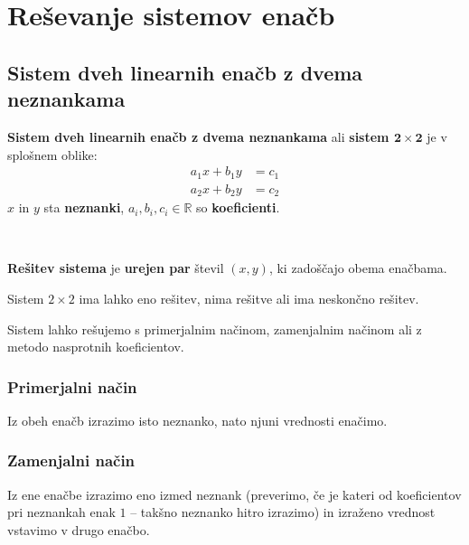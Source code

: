     \section{Reševanje sistemov enačb}

        

            \subsection{Sistem dveh linearnih enačb z dvema neznankama}

                \textbf{Sistem dveh linearnih enačb z dvema neznankama} ali \textbf{sistem $\mathbf{2\times 2}$} je v splošnem oblike:
                    $$\begin{aligned}
                            a_1x+b_1y&=c_1 \\ a_2x+b_2y&=c_2
                        \end{aligned}$$
                $x$ in $y$ sta \textbf{neznanki}, $a_i,b_i,c_i\in\mathbb{R}$ so \textbf{koeficienti}.
            
~
            
                \textbf{Rešitev sistema} je \textbf{urejen par} števil $(x,y)$, ki zadoščajo obema enačbama.
            

            
                    Sistem $2\times 2$ ima lahko eno rešitev, nima rešitve ali ima neskončno rešitev.
            

        

        
            
                Sistem lahko rešujemo s primerjalnim načinom, zamenjalnim načinom ali z metodo nasprotnih koeficientov.
            
        
            \subsubsection*{Primerjalni način}
                Iz obeh enačb izrazimo isto neznanko, nato njuni vrednosti enačimo.
            

            \subsubsection*{Zamenjalni način}
                Iz ene enačbe izrazimo eno izmed neznank (preverimo, če je kateri od koeficientov pri neznankah enak $1$ -- takšno neznanko hitro izrazimo) in izraženo vrednost vstavimo v drugo enačbo.
            

